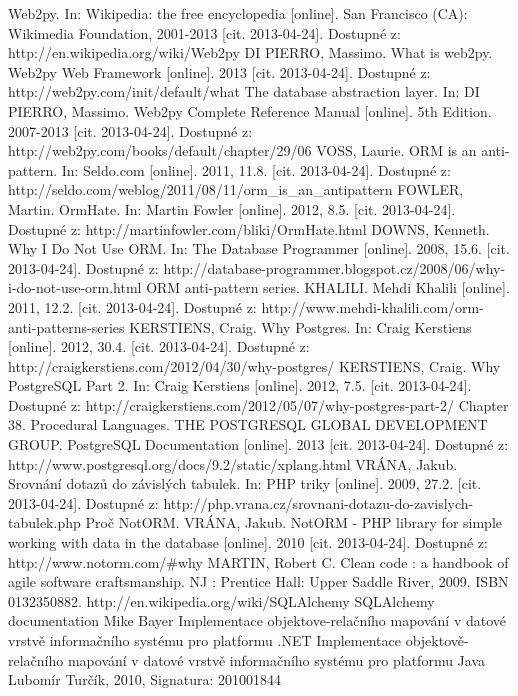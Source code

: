 \documentclass[ing,male,java,dept456]{diploma}						%
\begin{document}
\begin{thebibliography}{99}
 Web2py. In: Wikipedia: the free encyclopedia [online]. San Francisco (CA): Wikimedia Foundation, 2001-2013 [cit. 2013-04-24]. Dostupné z: http://en.wikipedia.org/wiki/Web2py
 DI PIERRO, Massimo. What is web2py. Web2py Web Framework [online]. 2013 [cit. 2013-04-24]. Dostupné z: http://web2py.com/init/default/what
 The database abstraction layer. In: DI PIERRO, Massimo. Web2py Complete Reference Manual [online]. 5th Edition. 2007-2013 [cit. 2013-04-24]. Dostupné z: http://web2py.com/books/default/chapter/29/06
 VOSS, Laurie. ORM is an anti-pattern. In: Seldo.com [online]. 2011, 11.8. [cit. 2013-04-24]. Dostupné z: http://seldo.com/weblog/2011/08/11/orm\_is\_an\_antipattern
 FOWLER, Martin. OrmHate. In: Martin Fowler [online]. 2012, 8.5. [cit. 2013-04-24]. Dostupné z: http://martinfowler.com/bliki/OrmHate.html
 DOWNS, Kenneth. Why I Do Not Use ORM. In: The Database Programmer [online]. 2008, 15.6. [cit. 2013-04-24]. Dostupné z: http://database-programmer.blogspot.cz/2008/06/why-i-do-not-use-orm.html
 ORM anti-pattern series. KHALILI. Mehdi Khalili [online]. 2011, 12.2. [cit. 2013-04-24]. Dostupné z: http://www.mehdi-khalili.com/orm-anti-patterns-series
 KERSTIENS, Craig. Why Postgres. In: Craig Kerstiens [online]. 2012, 30.4. [cit. 2013-04-24]. Dostupné z: http://craigkerstiens.com/2012/04/30/why-postgres/
 KERSTIENS, Craig. Why PostgreSQL Part 2. In: Craig Kerstiens [online]. 2012, 7.5. [cit. 2013-04-24]. Dostupné z: http://craigkerstiens.com/2012/05/07/why-postgres-part-2/
 Chapter 38. Procedural Languages. THE POSTGRESQL GLOBAL DEVELOPMENT GROUP. PostgreSQL Documentation [online]. 2013 [cit. 2013-04-24]. Dostupné z: http://www.postgresql.org/docs/9.2/static/xplang.html
 VRÁNA, Jakub. Srovnání dotazů do závislých tabulek. In: PHP triky [online]. 2009, 27.2. [cit. 2013-04-24]. Dostupné z: http://php.vrana.cz/srovnani-dotazu-do-zavislych-tabulek.php
 Proč NotORM. VRÁNA, Jakub. NotORM - PHP library for simple working with data in the database [online]. 2010 [cit. 2013-04-24]. Dostupné z: http://www.notorm.com/\#why
 MARTIN, Robert C. Clean code : a handbook of agile software craftsmanship. NJ : Prentice Hall: Upper Saddle River, 2009. ISBN 0132350882.
 http://en.wikipedia.org/wiki/SQLAlchemy
 SQLAlchemy documentation Mike Bayer
 Implementace objektove-relačního mapování v datové vrstvě informačního systému pro platformu .NET
 Implementace objektově-relačního mapování v datové vrstvě informačního systému pro platformu Java Lubomír Turčík, 2010, Signatura: 201001844
\end{thebibliography}
\end{document}
